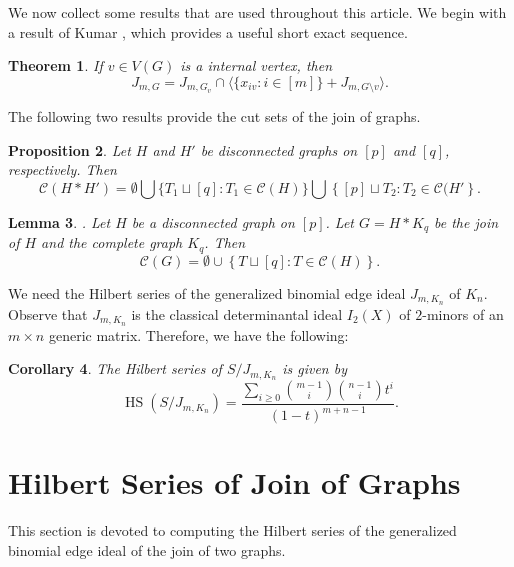 \documentclass[12pt,reqno]{amsart}
\newcommand \hs{\operatorname{HS}}
\theoremstyle{plain}
\newtheorem{theorem}{Theorem}[section]
\newtheorem{lemma}[theorem]{Lemma}
\newtheorem{proposition}[theorem]{Proposition}
\newtheorem{corollary}[theorem]{Corollary}
\theoremstyle{definition}
\begin{document}
We now collect some results that are used throughout this article. We begin with a result of Kumar \cite{Reg-bounds-of-GBEI-of-graphs-Arvind-2020}, which provides a useful short exact sequence.
\begin{theorem}\label{thm: Short exact sequence}\cite[Theorem 3.2]{Reg-bounds-of-GBEI-of-graphs-Arvind-2020}
    If $v\in  V(G)$ is a internal vertex, then $$J_{m,G}=J_{m,{G_v}}\cap \langle\{ x_{iv}:i\in [m]\}+J_{m,{G\setminus v}}\rangle.$$
\end{theorem}
The following two results provide the cut sets of the join of graphs. 
\begin{proposition}\label{prop: cut sets of join of two disconnected graphs}\cite[Proposition 4.14]{Some-CM-and-unmixed-BEI-Kiani-Madani-2015}
    Let $H$ and $H'$ be disconnected graphs on $[p]$ and $[q]$, respectively. Then $$\mathscr C(H*H')=\emptyset \bigcup\{T_1\sqcup [q]:T_1\in \mathscr C(H)\}\bigcup \left\{[p]\sqcup T_2:T_2\in \mathscr C(H'\right\}.$$
\end{proposition}
\begin{lemma}\label{lemma: cut sets of join of a disconnected graph and a complete graph}\cite[Lemma 4.3]{HS-of-BEI-Arvind-Sarkar-2019}.
    Let $H$ be a disconnected graph on $[p]$. Let $G=H*K_q$ be the join of $H$ and the complete graph $K_q$. Then $$\mathscr C(G)=\emptyset\cup \left\{T\sqcup[q]:T\in \mathscr C(H)\right\}.$$
\end{lemma}
We need the Hilbert series of the generalized binomial edge ideal $J_{m,K_n}$ of $K_n$. Observe that $J_{m,K_n}$ is the classical determinantal ideal $I_2(X)$ of $2$-minors of an $m\times n$ generic matrix. Therefore, we have the following:  
\begin{corollary}\cite[Corollary 1]{on-the-Hilbert-series-of-determinantal-rings-and-theire-canonical-module-Conca-Herzog-1994}\label{cor: hs of 2-minors} The Hilbert series of $S/J_{m,K_n}$ is given by
    \[
\hs(S/J_{m,K_n})
=
\frac{
\displaystyle
\sum_{i\geq0}
\binom{m-1}{i}
\binom{n-1}{i}
t^i
}
{(1-t)^{m+n-1}}.
\]
\end{corollary}
\section{Hilbert Series of Join of Graphs}\label{sec: HS of join of graphs}
This section is devoted to computing the Hilbert series of the generalized binomial edge ideal of the join of two graphs.
\end{document}
